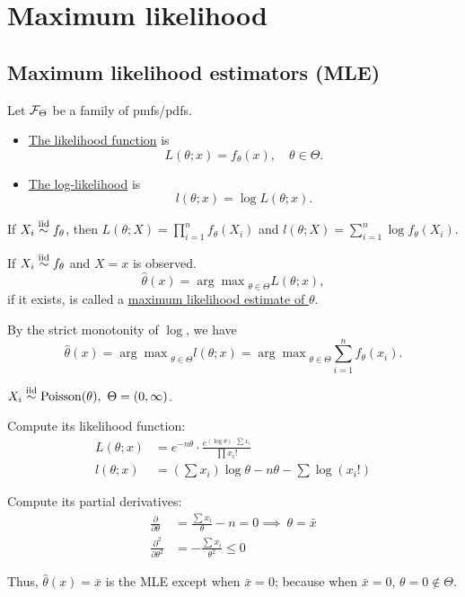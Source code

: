 \section{Maximum likelihood}
 
\subsection{Maximum likelihood estimators (MLE)}
\begin{mydef}
	Let $\mathcal{F}_\Theta$ be a family of pmfs/pdfs. 
	\begin{itemize}
		\item 
		\uline{The likelihood function} is
		$$L(\theta; x) = f_\theta (x),\quad \theta \in \Theta.$$
		
		\item
		\uline{The log-likelihood} is 
		$$l(\theta;x) = \log L(\theta; x).$$
	\end{itemize}
\end{mydef}
\begin{remark}
	If $X_i \stackrel{\text{iid}}{\sim} f_\theta$, then $L(\theta;X) = \prod_{i=1}^n f_\theta(X_i)$ and $l(\theta; X) =\sum_{i=1}^n \log f_\theta(X_i).$
\end{remark}
{\color{blue}
\begin{mydef}
	If $X_i \stackrel{\text{iid}}{\sim} f_\theta$ and $X = x$ is observed. 
	$$\hat{\theta}(x) = {\arg \max} _{\theta \in \Theta} L(\theta; x),$$
	if it exists, is called a \uline{maximum likelihood estimate of $\theta$}. 
\end{mydef}
}\begin{remark}
	By the strict monotonity of $\log$, we have
	$$\hat{\theta}(x) = {\arg \max} _{\theta \in \Theta} l(\theta; x) = {\arg \max} _{\theta \in \Theta} \sum_{i=1}^n f_\theta (x_i).$$
\end{remark}

\begin{exap}
	$X_i \SimIID \mathrm{Poisson}(\theta),\ \Theta = (0, \infty)$. 
	
	Compute its likelihood function:
	\begin{align*}
		L(\theta; x) &= e^{-n\theta} \cdot \frac{e^{(\log \theta)\cdot \sum x_i}}{\prod x_i!}\\
		l(\theta; x) &= (\sum x_i) \log \theta - n \theta - \sum \log(x_i !)
	\end{align*}
	
	Compute its partial derivatives:
	\begin{align*}
		\frac{\partial}{\partial \theta} &=  \frac{\sum x_i}{\theta} - n = 0 \implies \ \theta = \bar{x} \\
		\frac{\partial^2}{\partial \theta^2} &= - \frac{\sum x_i}{\theta^2} \leq 0
	\end{align*}
	
	Thus, $\hat{\theta}(x) = \bar{x}$ is the MLE except when $\bar{x} = 0$; because when $\bar{x} = 0$, $\theta = 0 \notin \Theta$.
\end{exap}

